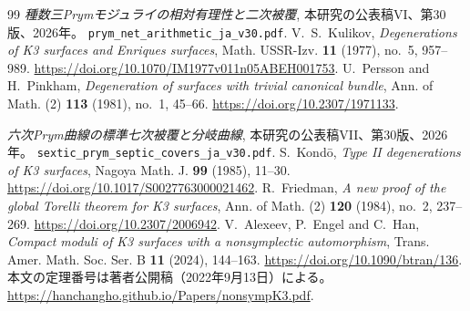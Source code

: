 \begin{thebibliography}{99}
\emph{種数三Prymモジュライの相対有理性と二次被覆}, 本研究の公表稿VI、第30版、2026年。
\nolinkurl{prym_net_arithmetic_ja_v30.pdf}.
V.~S.~Kulikov, \emph{Degenerations of K3 surfaces and Enriques surfaces},
Math. USSR-Izv. \textbf{11} (1977), no.~5, 957--989.
\url{https://doi.org/10.1070/IM1977v011n05ABEH001753}.
U.~Persson and H.~Pinkham, \emph{Degeneration of surfaces with trivial canonical bundle},
Ann. of Math. (2) \textbf{113} (1981), no.~1, 45--66.
\url{https://doi.org/10.2307/1971133}.


\emph{六次Prym曲線の標準七次被覆と分岐曲線}, 本研究の公表稿VII、第30版、2026年。
\nolinkurl{sextic_prym_septic_covers_ja_v30.pdf}.
S.~Kond\=o, \emph{Type II degenerations of K3 surfaces},
Nagoya Math. J. \textbf{99} (1985), 11--30.
\url{https://doi.org/10.1017/S0027763000021462}.
R.~Friedman, \emph{A new proof of the global Torelli theorem for K3 surfaces},
Ann. of Math. (2) \textbf{120} (1984), no.~2, 237--269.
\url{https://doi.org/10.2307/2006942}.
V.~Alexeev, P.~Engel and C.~Han,
\emph{Compact moduli of K3 surfaces with a nonsymplectic automorphism},
Trans. Amer. Math. Soc. Ser. B \textbf{11} (2024), 144--163.
\url{https://doi.org/10.1090/btran/136}.
本文の定理番号は著者公開稿（2022年9月13日）による。
\url{https://hanchangho.github.io/Papers/nonsympK3.pdf}.

\end{thebibliography}
\endgroup


